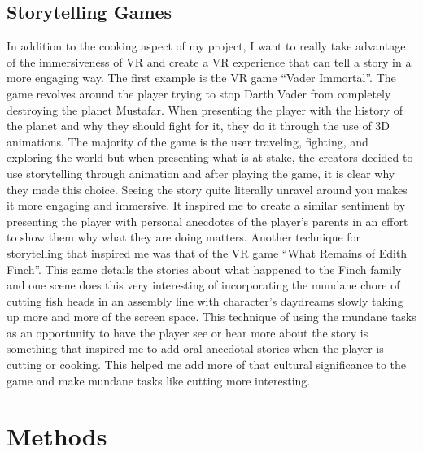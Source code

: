 \documentclass[10pt,twocolumn]{article}
\begin{document}
\subsection{Storytelling Games}
In addition to the cooking aspect of my project, I want to really take advantage of the immersiveness of VR and create a VR experience that can tell a story in a more engaging way. The first example is the VR game “Vader Immortal”\cite{vadarimmortal2019ep1}. The game revolves around the player trying to stop Darth Vader from completely destroying the planet Mustafar. When presenting the player with the history of the planet and why they should fight for it, they do it through the use of 3D animations. The majority of the game is the user traveling, fighting, and exploring the world but when presenting what is at stake, the creators decided to use storytelling through animation and after playing the game, it is clear why they made this choice. Seeing the story quite literally unravel around you makes it more engaging and immersive. It inspired me to create a similar sentiment by presenting the player with personal anecdotes of the player’s parents in an effort to show them why what they are doing matters. Another technique for storytelling that inspired me was that of the VR game “What Remains of Edith Finch”\cite{finch2019}. This game details the stories about what happened to the Finch family and one scene does this very interesting of incorporating the mundane chore of cutting fish heads in an assembly line with character’s daydreams slowly taking up more and more of the screen space. This technique of using the mundane tasks as an opportunity to have the player see or hear more about the story is something that inspired me to add oral anecdotal stories when the player is cutting or cooking. This helped me add more of that cultural significance to the game and make mundane tasks like cutting more interesting.

\section{Methods}
\end{document}

